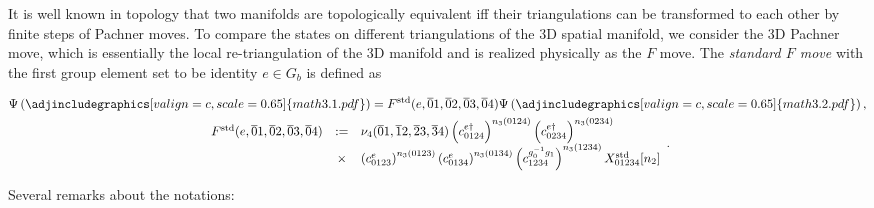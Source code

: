 \documentclass[%
 reprint,
 amsmath,amssymb,
 aps,
prb,
]{revtex4-2}
\begin{document}
It is well known in topology that two manifolds are topologically equivalent iff their triangulations can be transformed to each other by finite steps of Pachner moves.
To compare the states on different triangulations of the 3D spatial manifold, we consider the 3D Pachner move, which is essentially the local re-triangulation of the 3D manifold and is realized physically as the $F$ move.
The \textit{standard $F$ move} with the first group element set to be identity $e \in G_b$ is defined as 
\begin{widetext}
\begin{gather}
\Psi \left( \adjincludegraphics[valign=c,scale=0.65]{math3.1.pdf} \right) =F^{\mathrm{std}}( e,\overline{0} 1,\overline{0} 2,\overline{0} 3,\overline{0} 4) \Psi \left( \adjincludegraphics[valign=c,scale=0.65]{math3.2.pdf} \right) , \label{eq:F move std}\\
\begin{array}{ c c l }
F^{\mathrm{std}}( e,\overline{0} 1,\overline{0} 2,\overline{0} 3,\overline{0} 4) & := & \nu _{4}(\overline{0} 1,\overline{1} 2,\overline{2} 3,\overline{3} 4) \left( c_{0124}^{e\dagger }\right)^{n_{3}( 0124)}\left( c_{0234}^{e\dagger }\right)^{n_{3}( 0234)}\\ 
& \times  & \left( c_{0123}^{e}\right)^{n_{3}( 0123)}\left( c_{0134}^{e}\right)^{n_{3}( 0134)}\left( c_{1234}^{g_{0}^{-1} g_{1}}\right)^{n_{3}( 1234)} X_{01234}^{\mathrm{std}}[ n_{2}]
\end{array} . \label{eq:F move std.1}
\end{gather}
\end{widetext}
Several remarks about the notations:
\end{document}
